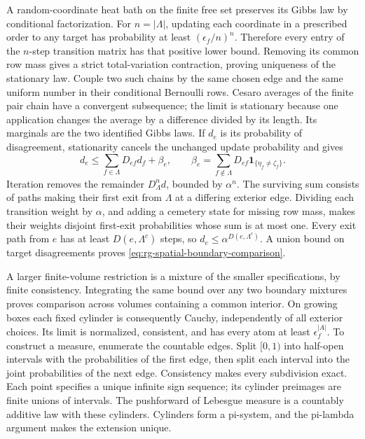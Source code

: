 A random-coordinate heat bath on the finite free set preserves its Gibbs
law by conditional factorization. For \(n=|\Lambda|\), updating each
coordinate in a prescribed order to any target has probability at least
\((\epsilon_f/n)^n\). Therefore every entry of the \(n\)-step transition
matrix has that positive lower bound. Removing its common row mass gives a
strict total-variation contraction, proving uniqueness of the stationary
law. Couple two such chains by the same chosen edge and the same uniform
number in their conditional Bernoulli rows. Cesaro averages of the finite
pair chain have a convergent subsequence; the limit is stationary because
one application changes the average by a difference divided by its length.
Its marginals are the two identified Gibbs laws. If \(d_e\) is its
probability of disagreement, stationarity cancels the unchanged update
probability and gives
\begin{equation}
 d_e\le\sum_{f\in\Lambda}D_{ef}d_f+\beta_e,
 \qquad \beta_e=\sum_{f\notin\Lambda}D_{ef}
                           \mathbf1_{\{\eta_f\ne\zeta_f\}}.
 \label{eq:rg-spatial-proof-stationary-comparison}
\end{equation}
Iteration removes the remainder \(D_\Lambda^n d\), bounded by
\(\alpha^n\). The surviving sum consists of paths making their first exit
from \(\Lambda\) at a differing exterior edge. Dividing each transition
weight by \(\alpha\), and adding a cemetery state for missing row mass,
makes their weights disjoint first-exit probabilities whose sum is at most
one. Every exit path from \(e\) has at least
\(D(e,\Lambda^c)\) steps, so
\(d_e\le\alpha^{D(e,\Lambda^c)}\). A union bound on target disagreements
proves \cref{eq:rg-spatial-boundary-comparison}.

A larger finite-volume restriction is a mixture of the smaller
specifications, by finite consistency. Integrating the same bound over any
two boundary mixtures proves comparison across volumes containing a common
interior. On growing boxes each fixed cylinder is consequently Cauchy,
independently of all exterior choices. Its limit is normalized, consistent,
and has every atom at least \(\epsilon_f^{|A|}\). To construct a measure,
enumerate the countable edges. Split \([0,1)\) into half-open intervals with
the probabilities of the first edge, then split each interval into the
joint probabilities of the next edge. Consistency makes every subdivision
exact. Each point specifies a unique infinite sign sequence; its cylinder
preimages are finite unions of intervals. The pushforward of Lebesgue
measure is a countably additive law with these cylinders. Cylinders form a
pi-system, and the pi-lambda argument makes the extension unique.

